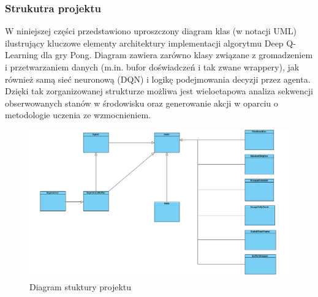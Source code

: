 \documentclass[a4paper, 12pt]{article}
\numberwithin{equation}{section}
\begin{document}
    \subsubsection{Strukutra projektu}
    W niniejszej części przedstawiono uproszczony diagram klas (w notacji UML) ilustrujący kluczowe elementy architektury implementacji algorytmu Deep Q-Learning dla gry Pong. Diagram zawiera zarówno klasy związane z gromadzeniem i przetwarzaniem danych (m.in. bufor doświadczeń i tak zwane wrappery), jak również samą sieć neuronową (DQN) i logikę podejmowania decyzji przez agenta. Dzięki tak zorganizowanej strukturze możliwa jest wieloetapowa analiza sekwencji obserwowanych stanów w środowisku oraz generowanie akcji w oparciu o metodologie uczenia ze wzmocnieniem.
    \begin{figure}[H]
        \centering
        \includegraphics[width=\textwidth]{pictures/DQN_diagram.png}
        \caption{Diagram stuktury projektu}
    \end{figure}
\end{document}
